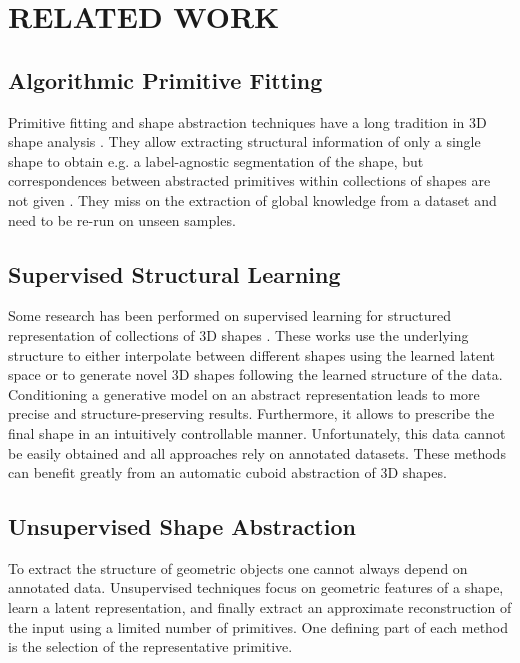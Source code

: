 \section{RELATED WORK}
\label{sec:related_work}


\subsection{Algorithmic Primitive Fitting}
Primitive fitting and shape abstraction techniques have a long tradition in 3D shape analysis \cite{RPM_Solina}.
They allow extracting structural information of only a single shape to obtain e.g. a label-agnostic segmentation of the shape, but correspondences between abstracted primitives within collections of shapes are not given \cite{SQS_Chevalier, SegMat_Lin}.
They miss on the extraction of global knowledge from a dataset and need to be re-run on unseen samples.


\subsection{Supervised Structural Learning}
Some research has been performed on supervised learning for structured representation of collections of 3D shapes \cite{GRASS_Li, SDM-Net_Gao, Structurenet_Mo, PASTA_Li}.
These works use the underlying structure to either interpolate between different shapes using the learned latent space or to generate novel 3D shapes following the learned structure of the data.
Conditioning a generative model on an abstract representation leads to more precise and structure-preserving results.
Furthermore, it allows to prescribe the final shape in an intuitively controllable manner.
Unfortunately, this data cannot be easily obtained and all approaches rely on annotated datasets.
These methods can benefit greatly from an automatic cuboid abstraction of 3D shapes.


\subsection{Unsupervised Shape Abstraction}
To extract the structure of geometric objects one cannot always depend on annotated data.
Unsupervised techniques focus on geometric features of a shape, learn a latent representation, and finally extract an approximate reconstruction of the input using a limited number of primitives.
One defining part of each method is the selection of the representative primitive.


